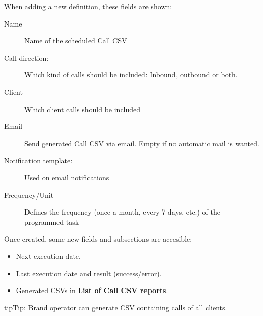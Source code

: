 \documentclass[letterpaper,10pt,english]{sphinxmanual}
\begin{document}
When adding a new definition, these fields are shown:
\begin{description}
\item[{Name}] \leavevmode{}\label{administration_portal/client/wholesale/calls/call_csv_schedulers:term-name}
Name of the scheduled Call CSV

\item[{Call direction:}] \leavevmode{}\label{administration_portal/client/wholesale/calls/call_csv_schedulers:term-call-direction}
Which kind of calls should be included: Inbound, outbound or both.

\item[{Client}] \leavevmode{}\label{administration_portal/client/wholesale/calls/call_csv_schedulers:term-client}
Which client calls should be included

\item[{Email}] \leavevmode{}\label{administration_portal/client/wholesale/calls/call_csv_schedulers:term-email}
Send generated Call CSV via email. Empty if no automatic mail is wanted.

\item[{Notification template:}] \leavevmode{}\label{administration_portal/client/wholesale/calls/call_csv_schedulers:term-notification-template}
Used on email notifications

\item[{Frequency/Unit}] \leavevmode{}\label{administration_portal/client/wholesale/calls/call_csv_schedulers:term-frequency-unit}
Defines the frequency (once a month, every 7 days, etc.) of the programmed task

\end{description}

Once created, some new fields and subsections are accesible:
\begin{itemize}
\item {} 
Next execution date.

\item {} 
Last execution date and result (success/error).

\item {} 
Generated CSVs in \textbf{List of Call CSV reports}.

\end{itemize}

\begin{notice}{tip}{Tip:}
Brand operator can generate CSV containing calls of all clients.
\end{notice}
\end{document}
